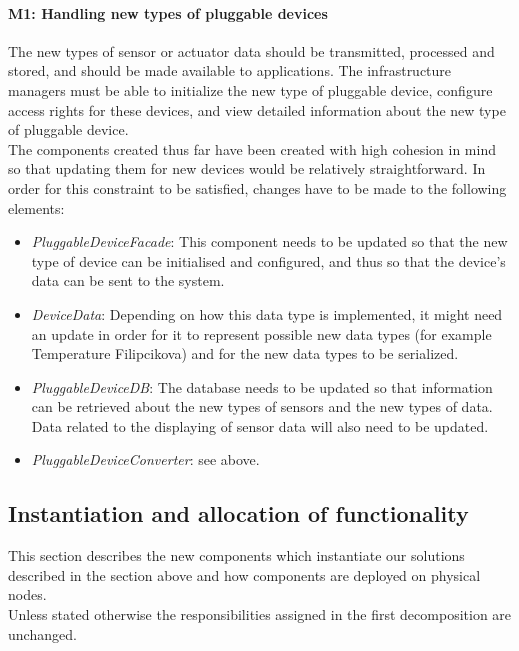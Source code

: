     \paragraph{M1: Handling new types of pluggable devices}
        The new types of sensor or actuator data should be transmitted,
        processed and stored, and should be made available to applications.
        The infrastructure managers must be able to initialize the new type
        of pluggable device, configure access rights for these devices, and
        view detailed information about the new type of pluggable device. \\
        The components created thus far have been created with high cohesion in
        mind so that updating them for new devices would be relatively straightforward.
        In order for this constraint to be satisfied, changes have to be made to
        the following elements:
        \begin{itemize}
            \item \emph{PluggableDeviceFacade}: This component needs to be updated
                  so that the new type of device can be initialised and configured,
                  and thus so that the device's data can be sent to the system.
            \item \emph{DeviceData}: Depending on how this data type
                  is implemented, it might need an update in order for it
                  to represent possible new data types (for example
                  Temperature Filipcikova) and for the new data types to be
                  serialized.
            \item \emph{PluggableDeviceDB}: The database needs to be updated
                  so that information can be retrieved about the new types
                  of sensors and the new types of data. Data related to the
                  displaying of sensor data will also need to be updated.
            \item \emph{PluggableDeviceConverter}: see above.
        \end{itemize}


\subsection{Instantiation and allocation of functionality}
    This section describes the new components which instantiate our solutions described
    in the section above and how components are deployed on physical nodes. \\
    Unless stated otherwise the responsibilities assigned in the first decomposition are unchanged.

